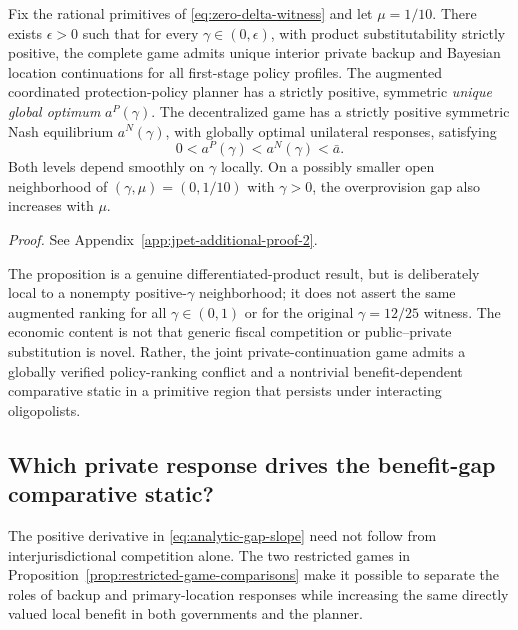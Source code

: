 \begin{proposition}
\label{prop:positive-gamma-extension}
Fix the rational primitives of \eqref{eq:zero-delta-witness} and
let $\mu=1/10$. There exists $\epsilon>0$ such that for every
$\gamma\in(0,\epsilon)$, with product substitutability strictly
positive, the complete game admits unique interior private backup
and Bayesian location continuations for all first-stage policy
profiles. The augmented coordinated protection-policy planner has a
strictly positive, symmetric \emph{unique global optimum}
$a^P(\gamma)$. The decentralized game has a strictly positive
symmetric Nash equilibrium $a^N(\gamma)$, with globally optimal
unilateral responses, satisfying
\begin{equation}
0<a^P(\gamma)<a^N(\gamma)<\bar a.
\label{eq:positive-gamma-ranking}
\end{equation}
Both levels depend smoothly on $\gamma$ locally. On a possibly
smaller open neighborhood of $(\gamma,\mu)=(0,1/10)$ with
$\gamma>0$, the overprovision gap also increases with $\mu$.
\end{proposition}

\noindent\emph{Proof.} See Appendix~\ref{app:jpet-additional-proof-2}.

The proposition is a genuine differentiated-product result,
but is deliberately local to a nonempty positive-$\gamma$
neighborhood; it does not assert the same augmented ranking
for all $\gamma\in(0,1)$ or for the original
$\gamma=12/25$ witness. The economic content is not that
generic fiscal competition or public--private substitution
is novel. Rather, the joint private-continuation game admits
a globally verified policy-ranking conflict and a
nontrivial benefit-dependent comparative static in a
primitive region that persists under interacting oligopolists.


\subsection{Which private response drives the benefit-gap comparative static?}

The positive derivative in
\eqref{eq:analytic-gap-slope} need not follow from
interjurisdictional competition alone. The two restricted
games in Proposition~\ref{prop:restricted-game-comparisons}
make it possible to separate the roles of backup and
primary-location responses while increasing the same
directly valued local benefit in both governments and the planner.

